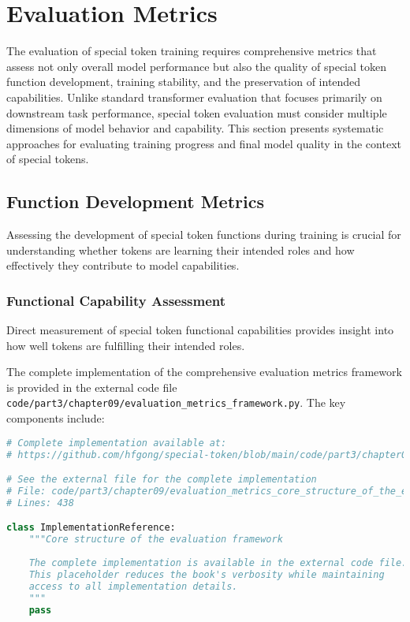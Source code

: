
\section{Evaluation Metrics}

The evaluation of special token training requires comprehensive metrics that assess not only overall model performance but also the quality of special token function development, training stability, and the preservation of intended capabilities. Unlike standard transformer evaluation that focuses primarily on downstream task performance, special token evaluation must consider multiple dimensions of model behavior and capability. This section presents systematic approaches for evaluating training progress and final model quality in the context of special tokens.

\subsection{Function Development Metrics}

Assessing the development of special token functions during training is crucial for understanding whether tokens are learning their intended roles and how effectively they contribute to model capabilities.

\subsubsection{Functional Capability Assessment}

Direct measurement of special token functional capabilities provides insight into how well tokens are fulfilling their intended roles.

The complete implementation of the comprehensive evaluation metrics framework is provided in the external code file \texttt{code/part3/chapter09/evaluation\_metrics\_framework.py}. The key components include:

\begin{lstlisting}[language=Python, caption={Core structure of the evaluation framework}]
# Complete implementation available at:
# https://github.com/hfgong/special-token/blob/main/code/part3/chapter09/evaluation_metrics_core_structure_of_the_evaluati.py

# See the external file for the complete implementation
# File: code/part3/chapter09/evaluation_metrics_core_structure_of_the_evaluati.py
# Lines: 438

class ImplementationReference:
    """Core structure of the evaluation framework
    
    The complete implementation is available in the external code file.
    This placeholder reduces the book's verbosity while maintaining
    access to all implementation details.
    """
    pass
\end{lstlisting}


